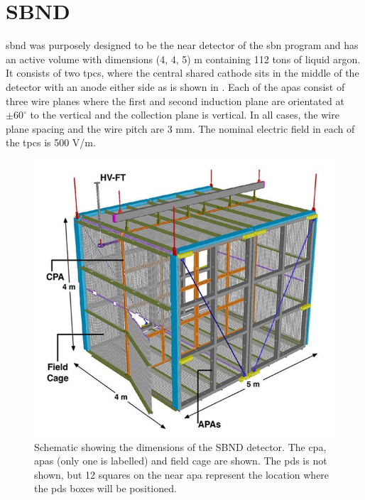 \section{SBND}\label{sec:SBND}
\gls{sbnd} was purposely designed to be the near detector of the \gls{sbn} program and has an active volume with dimensions (4, 4, 5) m containing 112 tons of liquid argon. It consists of two \glspl{tpc}, where the central shared cathode sits in the middle of the detector with an anode either side as is shown in . Each of the \glspl{apa} consist of three wire planes where the first and second induction plane are orientated at $\pm 60^{\circ}$ to the vertical and the collection plane is vertical. In all cases, the wire plane spacing and the wire pitch are 3 mm. The nominal electric field in each of the \glspl{tpc} is 500 V/m. 

\begin{figure}[!h]
    \centering
    \includegraphics[width = \largefigwidth]{figures-chap3/SBND.jpg}
    \caption[Schematic of the SBN detector.]{Schematic showing the dimensions of the SBND detector. The \gls{cpa}, \glspl{apa} (only one is labelled) and field cage are shown. The \gls{pds} is not shown, but 12 squares on the near \gls{apa} represent the location where the \gls{pds} boxes will be positioned. \cite{LArTPC_review}}
    \label{fig:sbnd_schematic}
\end{figure}

